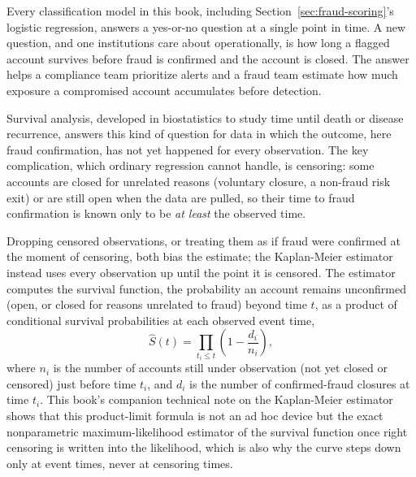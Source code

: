\documentclass[../ai_in_finance]{subfiles}
\begin{document}
Every classification model in this book, including Section~\ref{sec:fraud-scoring}'s logistic regression, answers a yes-or-no question at a single point in time. A new question, and one institutions care about operationally, is how long a flagged account survives before fraud is confirmed and the account is closed. The answer helps a compliance team prioritize alerts and a fraud team estimate how much exposure a compromised account accumulates before detection.

Survival analysis, developed in biostatistics to study time until death or disease recurrence, answers this kind of question for data in which the outcome, here fraud confirmation, has not yet happened for every observation. The key complication, which ordinary regression cannot handle, is censoring: some accounts are closed for unrelated reasons (voluntary closure, a non-fraud risk exit) or are still open when the data are pulled, so their time to fraud confirmation is known only to be \emph{at least} the observed time.

Dropping censored observations, or treating them as if fraud were confirmed at the moment of censoring, both bias the estimate; the Kaplan-Meier estimator instead uses every observation up until the point it is censored. The estimator computes the survival function, the probability an account remains unconfirmed (open, or closed for reasons unrelated to fraud) beyond time $t$, as a product of conditional survival probabilities at each observed event time,
\begin{equation}
\hat S(t) = \prod_{t_i \le t} \left(1 - \frac{d_i}{n_i}\right),
\label{eq:fraud-kaplan-meier}
\end{equation}
where $n_i$ is the number of accounts still under observation (not yet closed or censored) just before time $t_i$, and $d_i$ is the number of confirmed-fraud closures at time $t_i$. This book's companion technical note on the Kaplan-Meier estimator shows that this product-limit formula is not an ad hoc device but the exact nonparametric maximum-likelihood estimator of the survival function once right censoring is written into the likelihood, which is also why the curve steps down only at event times, never at censoring times.

\label{sec:km-example}
\end{document}
